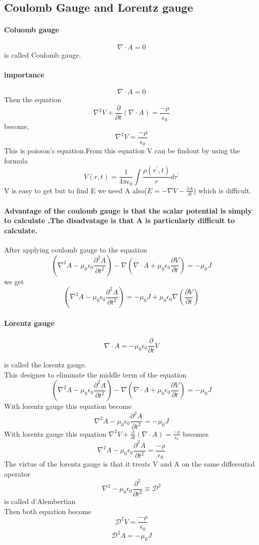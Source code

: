 \subsection{Coulomb Gauge and Lorentz gauge}
\paragraph{Coluomb gauge}
$$\nabla \cdot A=0$$ is called Coulomb gauge.\\
\paragraph{importance}
$$\nabla \cdot A=0$$ Then the equation 
$$\nabla ^2V+\frac{\partial }{\partial t}(\nabla \cdot A)=\frac{-\rho}{\epsilon_{0}}$$ become,\\
$$\nabla^2 V=\frac{-\rho}{\epsilon_{0}}$$
This is poisson's equation.From this equation V can be findout by using the formula\\
$$V(r,t)=\frac{1}{4 \pi \epsilon_0}\int \frac{\rho(r^{\prime},t)}{r}d\tau^{\prime}$$
V is easy to get but to find E we need  A also($E=-\nabla V-\frac{\partial A}{\partial t}$) which is difficult.
\paragraph{Advantage of the coulomb gauge is that the scalar potential is simply to calculate .The disadvatage is that  A is particularly difficult to calculate. }
After applying coulomb gauge to the equation 
$$\left( \nabla^2A-\mu_{0}\epsilon_{0}\frac{\partial^2 A}{\partial t^2}\right) -\nabla\left( \nabla \cdot A+\mu_{0}\epsilon_{0}\frac{\partial V}{\partial t}\right) =-\mu_{0} J$$ 
we get\\
$$\left( \nabla^2A-\mu_{0}\epsilon_{0}\frac{\partial^2 A}{\partial t^2}\right)=-\mu_{0}J+\mu_{0} \epsilon_{0}\nabla \left( \frac{\partial V}{\partial t}\right) $$
\paragraph{Lorentz gauge}
$$\nabla \cdot A =-\mu_{0} \epsilon_{0} \frac{\partial}{\partial t}V$$

 is called the lorentz gauge.\\
 This designes to eliminate the middle term of the equation
$$\left( \nabla^2A-\mu_{0}\epsilon_{0}\frac{\partial^2 A}{\partial t^2}\right) -\nabla\left( \nabla \cdot A+\mu_{0}\epsilon_{0}\frac{\partial V}{\partial t}\right) =-\mu_{0} J$$
With lorentz gauge this equation become
$$\nabla^2A-\mu_{0}\epsilon_{0}\frac{\partial^2 A}{\partial t^2}=-\mu_{0} J$$
With lorentz gauge this equation 
$\nabla ^2V+\frac{\partial }{\partial t}(\nabla \cdot A)=\frac{-\rho}{\epsilon_{0}}$
becomes
$$\nabla^2A-\mu_{0}\epsilon_{0}\frac{\partial^2 A}{\partial t^2}=\frac{-\rho}{\epsilon_{0}}$$
The virtue of the lorentz gauge is that it treats V and A on the same differential operator
$$\nabla^2-\mu_{0} \epsilon_{0}\frac{\partial ^2}{\partial t^2}\equiv \mathcal{D}^2  $$
 is called d'Alembertian\\
Then both equation become\\
$$\mathcal{D}^2V=\frac{-\rho}{\epsilon_{0}}$$
$$\mathcal{D}^2A=-\mu_{0} J$$
